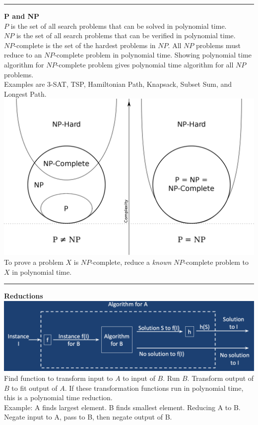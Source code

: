 \documentclass[9pt]{amsart}
\begin{document}
\begin{multicols*}{3}
  \vskip 7pt
  \hrule
  \vskip 7pt

  \textbf{P and NP} \\
  $P$ is the set of all search problems that can be solved in polynomial time. \\
  $NP$ is the set of all search problems that can be verified in polynomial time. \\
  $NP$-complete is the set of the hardest problems in $NP$. All $NP$ problems must reduce to an $NP$-complete problem in polynomial time. Showing polynomial time algorithm for $NP$-complete problem gives polynomial time algorithm for all $NP$ problems. \\
  Examples are 3-SAT, TSP, Hamiltonian Path, Knapsack, Subset Sum, and Longest Path.
  \includegraphics[width=\columnwidth]{pnp.png}
  To prove a problem $X$ is $NP$-complete, reduce a \textit{known} $NP$-complete problem to $X$ in polynomial time.

  \vskip 7pt
  \hrule
  \vskip 7pt

  \textbf{Reductions} \\
  \includegraphics[width=\columnwidth]{reduction.png}
  Find function to transform input to $A$ to input of $B$. Run $B$. Transform output of $B$ to fit output of $A$. If these transformation functions run in polynomial time, this is a polynomial time reduction.\\
  Example: A finds largest element. B finds smallest element. Reducing A to B. Negate input to A, pass to B, then negate output of B.


\end{multicols*}
\end{document}
